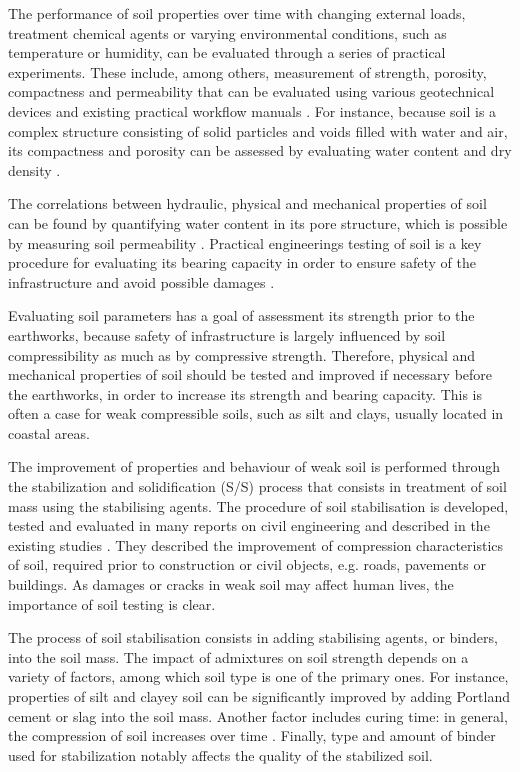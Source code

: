 \documentclass{amestyle}
\begin{document}
The performance of soil properties over time with changing external loads, treatment chemical agents or varying environmental conditions, such as temperature or humidity, can be evaluated through a series of practical experiments. These include, among others, measurement of strength, porosity, compactness and permeability that can be evaluated using various geotechnical devices and existing practical workflow manuals \cite{Day2001,Davis2008}. For instance, because soil is a complex structure consisting of solid particles and voids filled with water and air, its compactness and porosity can be assessed by evaluating water content and dry density \cite{Hillel}. 

The correlations between hydraulic, physical and mechanical properties of soil can be found by quantifying water content in its pore structure, which is possible by measuring soil permeability \cite{BARBOSA2022115673}. Practical engineerings testing of soil is a key procedure for evaluating its bearing capacity in order to ensure safety of the infrastructure and avoid possible damages \cite{OBIANYO2020120677,BAKAIYANG2021e00626,HAN20181187,KAMAL20212660}. 

Evaluating soil parameters has a goal of assessment its strength prior to the earthworks, because safety of infrastructure is largely influenced by soil compressibility as much as by compressive strength. Therefore, physical and mechanical properties of soil should be tested and improved if necessary before the earthworks, in order to increase its strength and bearing capacity. This is often a case for weak compressible soils, such as silt and clays, usually located in coastal areas. 

The improvement of properties and behaviour of weak soil is performed through the stabilization and solidification (S/S) process that consists in treatment of soil mass using the stabilising agents. The procedure of soil stabilisation is developed, tested and evaluated in many reports on civil engineering and described in the existing studies \cite{Jauberthie,Lindh202102,ArabiWild,Lindh2004}. They described the improvement of compression characteristics of soil, required prior to construction or civil objects, e.g. roads, pavements or buildings. As damages or cracks in weak soil may affect human lives, the importance of soil testing is clear. 

The process of soil stabilisation consists in adding stabilising agents, or binders, into the soil mass. The impact of admixtures on soil strength depends on a variety of factors, among which soil type is one of the primary ones. For instance, properties of silt and clayey soil can be significantly improved by adding Portland cement or slag into the soil mass. Another factor includes curing time: in general, the compression of soil increases over time \cite{Lindh202102}. Finally, type and amount of binder used for stabilization notably affects the quality of the stabilized soil. 
\end{document}
